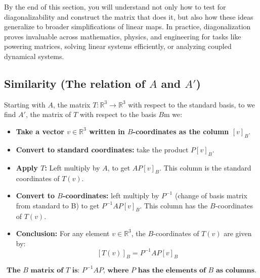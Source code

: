 \documentclass[a4paper, 9pt]{extarticle}
\begin{document}
\noindent By the end of this section, you will understand not only how to test for diagonalizability and construct the matrix that does it, but also how these ideas generalize to broader simplifications of linear maps. In practice, diagonalization proves invaluable across mathematics, physics, and engineering for tasks like powering matrices, solving linear systems efficiently, or analyzing coupled dynamical systems.\\[2ex]

\subsection{Similarity (The relation of $A$ and $A'$)}
Starting with $A$, the matrix $T: \mathbb{R}^3 \to \mathbb{R}^3$ with respect to the standard basis, to we find $A'$, the matrix of $T$ with respect to the basis $B$m we:
\begin{itemize}
  \item \textbf{Take a vector $v \in \mathbb{R}^3$ written in $B$-coordinates as the column $[v]_B$}.
  \item \textbf{Convert to standard coordinates:} take the product $P[v]_B$.
  \item \textbf{Apply $T$:} Left multiply by $A$, to get $AP[v]_B$. This column is the standard coordinates of $T(v)$.
  \item \textbf{Convert to $B$-coordinates:} left multiply by $P^{-1}$ (change of basis matrix from standard to B) to get $P^{-1}AP[v]_B$. This column has the $B$-coordinates of $T(v)$.
  \item \textbf{Conclusion:}  For any element $v \in \mathbb{R}^3$, the $B$-coordinates of $T(v)$ are given by:
        $$
          [T(v)]_B = P^{-1}AP[v]_B
        $$
\end{itemize}
$$\textbf{The $B$ matrix of $T$ is: $P^{-1}AP$, where $P$ has the elements of $B$ as columns.}$$
\end{document}
